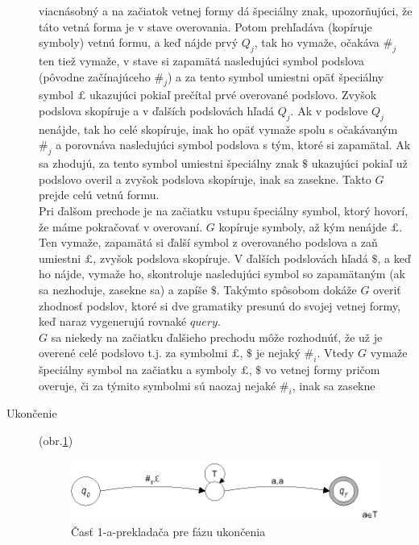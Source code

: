 \begin{dokaz}
\begin{description}
    viacnásobný a na začiatok vetnej formy dá špeciálny znak, upozorňujúci,
    že táto vetná forma je v stave overovania. Potom prehľadáva
    (kopíruje symboly) vetnú formu, a keď nájde prvý $Q_j$, tak ho
    vymaže, očakáva $\#_j$ ten tiež vymaže, v stave si zapamätá
    nasledujúci symbol podslova (pôvodne začínajúceho $\#_j$) a za
    tento symbol umiestni opäť špeciálny symbol $\pounds$ ukazujúci pokiaľ
    prečítal prvé overované podslovo. Zvyšok podslova skopíruje a v
    ďalších podslovách hľadá $Q_j$. Ak v podslove $Q_j$ nenájde, tak
    ho celé skopíruje, inak ho opäť vymaže spolu s očakávaným $\#_j$
    a porovnáva nasledujúci symbol podslova s tým, ktoré si
    zapamätal. Ak sa zhodujú, za tento symbol umiestni špeciálny
    znak $\$$ ukazujúci pokiaľ už podslovo overil a zvyšok podslova
    skopíruje, inak sa zasekne. Takto $G$ prejde celú vetnú formu.
    \\ Pri ďalšom prechode je na začiatku vstupu špeciálny symbol,
    ktorý hovorí, že máme pokračovať v overovaní. $G$ kopíruje
    symboly, až kým nenájde $\pounds$. Ten vymaže, zapamätá si ďalší
    symbol z overovaného podslova a zaň umiestni $\pounds$, zvyšok
    podslova skopíruje. V ďalších podslovách hľadá $\$$, a keď ho
    nájde, vymaže ho, skontroluje nasledujúci symbol so zapamätaným
    (ak sa nezhoduje, zasekne sa) a zapíše $\$$. Takýmto spôsobom
    dokáže $G$ overiť zhodnosť podslov, ktoré si dve gramatiky
    presunú do svojej vetnej formy, keď naraz vygenerujú rovnaké
    $query$.
    \\ $G$ sa niekedy na začiatku ďalšieho prechodu môže rozhodnúť,
    že už je overené celé podslovo t.j. za symbolmi $\pounds$, $\$$
    je nejaký $\#_i$. Vtedy $G$ vymaže špeciálny symbol na začiatku
    a symboly $\pounds$, $\$$ vo vetnej formy pričom overuje, či za
    týmito symbolmi sú naozaj nejaké $\#_i$, inak sa zasekne

    \item[Ukončenie] (obr.\ref{pcgsgs4})

  \begin{figure}[ht]
    \centering
    \includegraphics{img/pcgsgs/pcgsgs4}
    \caption{Časť 1-a-prekladača pre fázu ukončenia}\label{pcgsgs4}
  \end{figure}


\end{description}
\end{dokaz}
